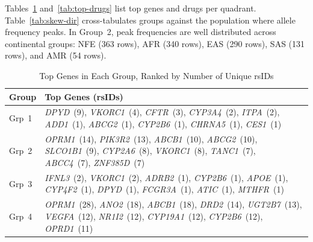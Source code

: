 \documentclass[conference]{IEEEtran}
\begin{document}
Tables~\ref{tab:top-genes} and~\ref{tab:top-drugs} list top genes and drugs per quadrant.
Table~\ref{tab:skew-dir} cross-tabulates groups against the population where allele frequency peaks.
In Group~2, peak frequencies are well distributed across continental groups: NFE (363 rows), AFR (340 rows), EAS (290 rows), SAS (131 rows), and AMR (54 rows).

\begin{table}[!t]
\centering
\caption{Top Genes in Each Group, Ranked by Number of Unique rsIDs}
\label{tab:top-genes}
\renewcommand{\arraystretch}{1.15}
\begin{tabular}{|l|p{14cm}|}
\hline
\textbf{Group} & \textbf{Top Genes (rsIDs)} \\
\hline
\textcolor{group1}{Grp~1} & \textit{DPYD}~(9), \textit{VKORC1}~(4), \textit{CFTR}~(3), \textit{CYP3A4}~(2), \textit{ITPA}~(2), \textit{ADD1}~(1), \textit{ABCG2}~(1), \textit{CYP2B6}~(1), \textit{CHRNA5}~(1), \textit{CES1}~(1) \\
\hline
\textcolor{group2}{Grp~2} & \textit{OPRM1}~(14), \textit{PIK3R2}~(13), \textit{ABCB1}~(10), \textit{ABCG2}~(10), \textit{SLCO1B1}~(9), \textit{CYP2A6}~(8), \textit{VKORC1}~(8), \textit{TANC1}~(7), \textit{ABCC4}~(7), \textit{ZNF385D}~(7) \\
\hline
\textcolor{group3}{Grp~3} & \textit{IFNL3}~(2), \textit{VKORC1}~(2), \textit{ADRB2}~(1), \textit{CYP2B6}~(1), \textit{APOE}~(1), \textit{CYP4F2}~(1), \textit{DPYD}~(1), \textit{FCGR3A}~(1), \textit{ATIC}~(1), \textit{MTHFR}~(1) \\
\hline
\textcolor{group4}{Grp~4} & \textit{OPRM1}~(28), \textit{ANO2}~(18), \textit{ABCB1}~(18), \textit{DRD2}~(14), \textit{UGT2B7}~(13), \textit{VEGFA}~(12), \textit{NR1I2}~(12), \textit{CYP19A1}~(12), \textit{CYP2B6}~(12), \textit{OPRD1}~(11) \\
\hline
\end{tabular}
\end{table}
\end{document}
